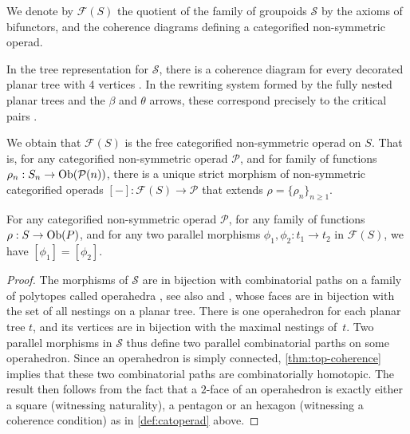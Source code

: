 \begin{definition}
    We denote by $\mathcal{F}(S)$ the quotient of the family of groupoids $\mathcal{S}$ by the axioms of bifunctors, and the coherence diagrams defining a categorified non-symmetric operad. 
\end{definition}

\begin{rem}
    In the tree representation for $\mathcal{S}$, there is a coherence diagram for every decorated planar tree with 4 vertices \cite[p.258]{curienSyntacticAspectsHypergraph2019a}.
    In the rewriting system formed by the fully nested planar trees and the $\beta$ and $\theta$ arrows, these correspond precisely to the critical pairs \cite[Section 6.2]{baaderTermRewritingAll1998}.
\end{rem}

We obtain that $\mathcal{F}(S)$ is the free categorified non-symmetric operad on $S$. 
That is, for any categorified non-symmetric operad $\mathcal{P}$, and for family of functions $\rho_n : S_n \to \mathrm{Ob}(\mathcal{P}(n))$, there is a unique strict morphism of non-symmetric categorified operads $[-]:\mathcal{F}(S) \to \mathcal{P}$ that extends $\rho=\{\rho_n\}_{n\geq 1}$. 

\begin{thm}
\label{thm:coherence-operahedra}
    For any categorified non-symmetric operad $\mathcal{P}$, for any family of functions $\rho : S \to \mathrm{Ob}(P)$, and for any two parallel morphisms $\phi_1,\phi_2: t_1 \to t_2$ in $\mathcal{F}(S)$, we have $[\phi_1]=[\phi_2]$.
\end{thm}

\begin{proof}
The morphisms of $\mathcal{S}$ are in bijection with combinatorial paths on a family of polytopes called operahedra \cite[Section 2.1]{laplante-anfossiDiagonalOperahedra2022a}, see also \cite[Section 13]{DP15} and \cite{curienSyntacticAspectsHypergraph2019a}, whose faces are in bijection with the set of all nestings on a planar tree. 
There is one operahedron for each planar tree $t$, and its vertices are in bijection with the maximal nestings of~$t$. 
Two parallel morphisms in $\mathcal{S}$ thus define two parallel combinatorial parths on some operahedron. 
Since an operahedron is simply connected, \cref{thm:top-coherence} implies that these two combinatorial paths are combinatorially homotopic. 
The result then follows from the fact that a $2$-face of an operahedron is exactly either a square (witnessing naturality), a pentagon or an hexagon (witnessing a coherence condition) as in \cref{def:catoperad} above.
\end{proof}

